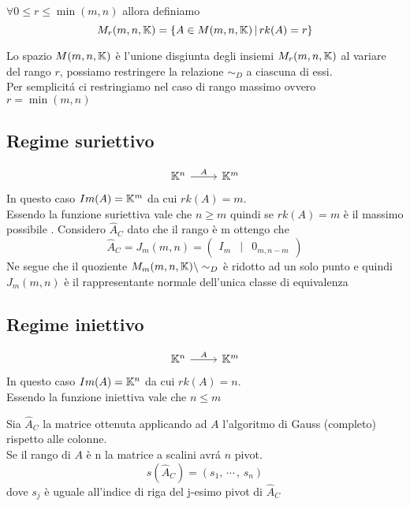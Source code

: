 \begin{defn}
$\forall  0\leq r \leq \min(m,n) $ allora definiamo 
$$ M_r(m,n, \mathbb{K} ) = \{ A \in M(m,n,\mathbb{K}) \, \vert \, rk(A)=r \} $$
\end{defn}
Lo spazio $M(m,n,\mathbb{K}) $ \`e l'unione disgiunta degli insiemi $M_r(m,n,\mathbb{K}) $ al variare del rango $r$, possiamo restringere la relazione $\sim_D$ a ciascuna di essi.\\
Per semplicit\'a ci restringiamo nel caso di rango massimo ovvero $ r=\min(m,n) $ 

\spazio


 \subsection*{Regime suriettivo} 


$$\begin{tikzcd} \K^n\arrow[r,"A"] & \K ^m \end{tikzcd} $$
In questo caso $Im(A)= \mathbb{K} ^m $ da cui $rk(A)=m $.\\
Essendo la funzione suriettiva vale che $n \geq m $ 	quindi se $rk(A)=m$ \`e il massimo possibile . 
\spazio
Considero $ \hat{A}_C$ dato che il rango \`e m ottengo che 
$$ \hat{A}_C=J_m(m,n)= \begin{pmatrix}
I_m & \vert & 0_{m,n-m} 
\end{pmatrix}$$
Ne segue che il quoziente $M_m(m,n,\mathbb{K})\backslash\sim_D$ \`e ridotto ad un solo punto e quindi $J_m(m,n)$ \`e il rappresentante normale dell'unica classe di equivalenza
 \newpage
 \subsection*{Regime iniettivo} 
 $$\begin{tikzcd} \K^n\arrow[r,"A"] & \K ^m \end{tikzcd} $$
 In questo caso $Im(A)=\mathbb{K}^n $ da cui $rk(A)=n $.\\
 Essendo la funzione iniettiva vale che $n\leq m $
 \begin{defn}\bianco
 Sia $\hat{A}_C$ la matrice ottenuta applicando ad $A$ l'algoritmo di Gauss (completo) rispetto alle colonne.\\
Se il rango di $A$ \`e n la matrice a scalini avr\'a $n$ pivot.
 $$s(\hat{A}_C)=(s_1,\, \cdots\, ,\, s_n )$$
 dove $s_j$ \`e uguale all'indice di riga del j-esimo pivot di $\hat{A}_C$
 \end{defn}
 
